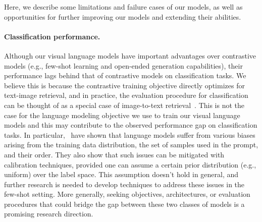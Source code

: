 Here, we describe some limitations and failure cases of our models, as well as opportunities for further improving our models and extending their abilities.

\paragraph{Classification performance.}

Although our visual language models have important advantages over contrastive models (e.g., few-shot learning and open-ended generation capabilities), their performance lags behind that of contrastive models on classification tasks.
We believe this is because the contrastive training objective directly optimizes for text-image retrieval, %
and in practice, the evaluation procedure for classification can be thought of as a special case of image-to-text retrieval~\citep{clip}. %
This is not the case for the language modeling objective we use to train our visual language models
and this may contribute to the observed performance gap on classification tasks.
In particular,~\citet{zhao2021calibrate} have shown that language models suffer from various biases arising from the training data distribution, the set of samples used in the prompt, and their order.
They also show that such issues can be mitigated with calibration techniques,
provided one can assume a certain prior distribution (e.g., uniform) over the label space.
This assumption doesn't hold in general, and further research is needed to develop techniques to address these issues in the few-shot setting.
More generally, seeking objectives, architectures, or evaluation procedures that could bridge the gap between these two classes of models is a promising research direction.

